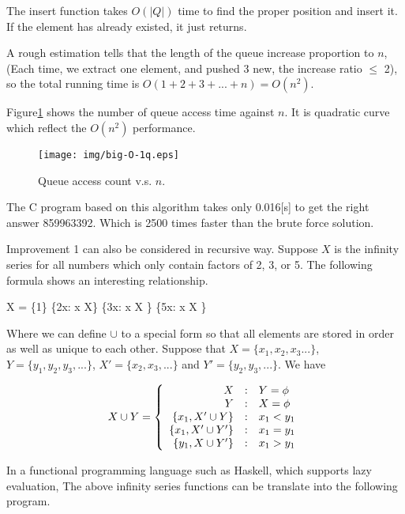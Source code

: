 \documentclass[UTF8]{article}
\begin{document}
The insert function takes $O(|Q|)$ time to find the proper position and insert
it. If the element has already existed, it just returns.

A rough estimation tells that the length of the queue increase proportion to $n$,
(Each time, we extract one element, and pushed 3 new, the increase ratio $\leq$ 2),
so the total running time is $O(1+2+3+...+n) = O(n^2)$.

Figure\ref{fig:big-O-1q} shows the number of queue access time against $n$.
It is quadratic curve which reflect the $O(n^2)$ performance.

\begin{figure}[htbp]
       \begin{center}
       	  \texttt{[image: img/big-O-1q.eps]}
        \caption{Queue access count v.s. $n$.} \label{fig:big-O-1q}
       \end{center}
\end{figure}

The C program based on this algorithm takes only 0.016[s] to get the right answer
859963392. Which is 2500 times faster than the brute force solution.

Improvement 1 can also be considered in recursive way. Suppose $X$ is the infinity
series for all numbers which only contain factors of 2, 3, or 5. The following
formula shows an interesting relationship.

\be
  X = \{1\} \cup \{2x: \forall x \in X\} \cup \{3x: \forall x \in X \} \cup \{5x: \forall x \in X \}
\ee

Where we can define $\cup$ to a special form so that all elements are stored in order
as well as unique to each other. Suppose that $X=\{x_1, x_2, x_3...\}$, $Y=\{y_1, y_2, y_3, ...\}$, $X' = \{x_2, x_3, ...\}$ and $Y'=\{y_2, y_3, ...\}$. We have

\[
X \cup Y = \left \{
  \begin{array}{r@{\quad:\quad}l}
  X & Y = \phi \\
  Y & X = \phi \\
  \{ x_1, X' \cup Y \} & x_1 < y_1 \\
  \{ x_1, X' \cup Y' \} & x_1 = y_1 \\
  \{ y_1, X \cup Y' \} & x_1 > y_1
  \end{array}
\right.
\]

In a functional programming language such as Haskell, which supports
lazy evaluation, The above infinity series functions can be translate
into the following program.
\end{document}
